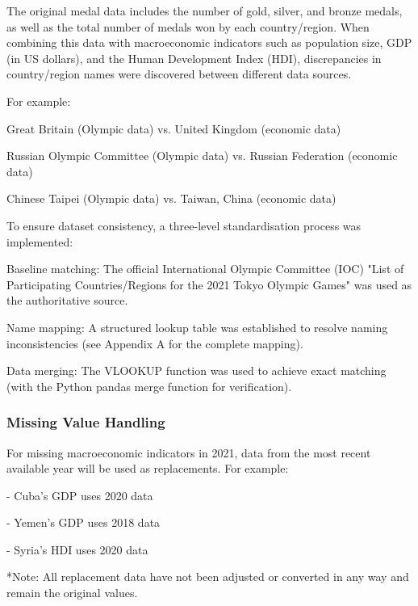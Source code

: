\documentclass[11pt,twoside]{article}
\numberwithin{Theorem}{section}
\numberwithin{Definition}{section}
\numberwithin{Lemma}{section}
\numberwithin{Algorithm}{section}
\numberwithin{equation}{section}
\begin{document}
The original medal data includes the number of gold, silver, and bronze medals, as well as the total number of medals won by each country/region. When combining this data with macroeconomic indicators such as population size, GDP (in US dollars), and the Human Development Index (HDI), discrepancies in country/region names were discovered between different data sources. 

For example:

    \item Great Britain (Olympic data) vs. United Kingdom (economic data)

    \item Russian Olympic Committee (Olympic data) vs. Russian Federation (economic data)

    \item Chinese Taipei (Olympic data) vs. Taiwan, China (economic data)



To ensure dataset consistency, a three-level standardisation process was implemented:

    \item Baseline matching: The official International Olympic Committee (IOC) "List of Participating Countries/Regions for the 2021 Tokyo Olympic Games" was used as the authoritative source.

    \item Name mapping: A structured lookup table was established to resolve naming inconsistencies (see Appendix A for the complete mapping).

    \item Data merging: The VLOOKUP function was used to achieve exact matching (with the Python pandas merge function for verification).

\subsubsection{Missing Value Handling}



For missing macroeconomic indicators in 2021, data from the most recent available year will be used as replacements. For example:

- Cuba's GDP uses 2020 data

- Yemen's GDP uses 2018 data

- Syria's HDI uses 2020 data

*Note: All replacement data have not been adjusted or converted in any way and remain the original values.
\end{document}
